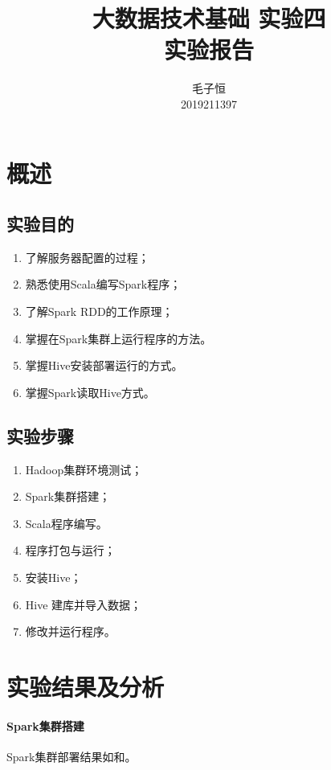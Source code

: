 \documentclass[lang=cn,11pt,a4paper,cite=authornum]{paper}
\title{大数据技术基础 实验四 \\ 实验报告}
\author{毛子恒 \\ 2019211397}
\institute{北京邮电大学\ 计算机学院}
\date{\zhtoday}
\begin{document}
\maketitle

\section{概述}

\subsection{实验目的}

\begin{enumerate}
    \item 了解服务器配置的过程；
    \item 熟悉使用Scala编写Spark程序；
    \item 了解Spark RDD的工作原理；
    \item 掌握在Spark集群上运行程序的方法。
    \item 掌握Hive安装部署运行的方式。
    \item 掌握Spark读取Hive方式。
\end{enumerate}

\subsection{实验步骤}

\begin{enumerate}
    \item Hadoop集群环境测试；
    \item Spark集群搭建；
    \item Scala程序编写。
    \item 程序打包与运行；
    \item 安装Hive；
    \item Hive 建库并导入数据；
    \item 修改并运行程序。
\end{enumerate}

\section{实验结果及分析}

\paragraph{Spark集群搭建}

Spark集群部署结果如和。
\end{document}
